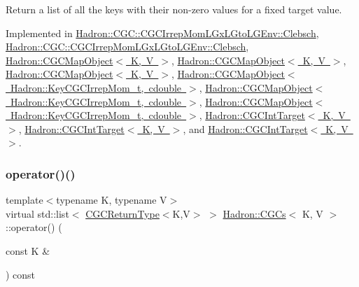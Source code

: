Return a list of all the keys with their non-\/zero values for a fixed target value. 



Implemented in \mbox{\hyperlink{classHadron_1_1CGC_1_1CGCIrrepMomLGxLGtoLGEnv_1_1Clebsch_a8a003db7855154fba35df2485da43353}{Hadron\+::\+C\+G\+C\+::\+C\+G\+C\+Irrep\+Mom\+L\+Gx\+L\+Gto\+L\+G\+Env\+::\+Clebsch}}, \mbox{\hyperlink{classHadron_1_1CGC_1_1CGCIrrepMomLGxLGtoLGEnv_1_1Clebsch_a8a003db7855154fba35df2485da43353}{Hadron\+::\+C\+G\+C\+::\+C\+G\+C\+Irrep\+Mom\+L\+Gx\+L\+Gto\+L\+G\+Env\+::\+Clebsch}}, \mbox{\hyperlink{classHadron_1_1CGCMapObject_aeb342dc81f17743a25b969f540db4edf}{Hadron\+::\+C\+G\+C\+Map\+Object$<$ K, V $>$}}, \mbox{\hyperlink{classHadron_1_1CGCMapObject_aeb342dc81f17743a25b969f540db4edf}{Hadron\+::\+C\+G\+C\+Map\+Object$<$ K, V $>$}}, \mbox{\hyperlink{classHadron_1_1CGCMapObject_aeb342dc81f17743a25b969f540db4edf}{Hadron\+::\+C\+G\+C\+Map\+Object$<$ K, V $>$}}, \mbox{\hyperlink{classHadron_1_1CGCMapObject_aeb342dc81f17743a25b969f540db4edf}{Hadron\+::\+C\+G\+C\+Map\+Object$<$ Hadron\+::\+Key\+C\+G\+C\+Irrep\+Mom\+\_\+t, cdouble $>$}}, \mbox{\hyperlink{classHadron_1_1CGCMapObject_aeb342dc81f17743a25b969f540db4edf}{Hadron\+::\+C\+G\+C\+Map\+Object$<$ Hadron\+::\+Key\+C\+G\+C\+Irrep\+Mom\+\_\+t, cdouble $>$}}, \mbox{\hyperlink{classHadron_1_1CGCMapObject_aeb342dc81f17743a25b969f540db4edf}{Hadron\+::\+C\+G\+C\+Map\+Object$<$ Hadron\+::\+Key\+C\+G\+C\+Irrep\+Mom\+\_\+t, cdouble $>$}}, \mbox{\hyperlink{classHadron_1_1CGCIntTarget_a5946627ddb796961b97b7e0c57e32d83}{Hadron\+::\+C\+G\+C\+Int\+Target$<$ K, V $>$}}, \mbox{\hyperlink{classHadron_1_1CGCIntTarget_a5946627ddb796961b97b7e0c57e32d83}{Hadron\+::\+C\+G\+C\+Int\+Target$<$ K, V $>$}}, and \mbox{\hyperlink{classHadron_1_1CGCIntTarget_a5946627ddb796961b97b7e0c57e32d83}{Hadron\+::\+C\+G\+C\+Int\+Target$<$ K, V $>$}}.

\mbox{\label{classHadron_1_1CGCs_a8d2d80be37b603359708ebdd5923ff47}} 
\subsubsection{\texorpdfstring{operator()()}{operator()()}\hspace{0.1cm}{\footnotesize\ttfamily [5/6]}}
{\footnotesize\ttfamily template$<$typename K, typename V$>$ \\
virtual std\+::list$<$ \mbox{\hyperlink{structHadron_1_1CGCReturnType}{C\+G\+C\+Return\+Type}}$<$K,V$>$ $>$ \mbox{\hyperlink{classHadron_1_1CGCs}{Hadron\+::\+C\+G\+Cs}}$<$ K, V $>$\+::operator() (\begin{DoxyParamCaption}\item[{const K \&}]{ }\end{DoxyParamCaption}) const\hspace{0.3cm}{\ttfamily [pure virtual]}}




